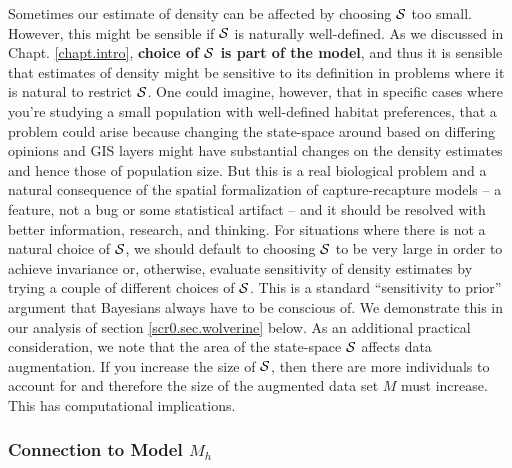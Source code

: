 Sometimes our estimate of density can be affected by choosing ${\cal
  S}$ too small. However, this might be sensible if ${\cal S}$ is
naturally well-defined. As we discussed in Chapt. \ref{chapt.intro},
{\bf choice of ${\cal S}$ is part of the model}, and thus it is
sensible that estimates of density might be sensitive to its
definition in problems where it is natural to restrict ${\cal S}$.
One could imagine, however, that in specific cases where you're
studying a small population with well-defined habitat preferences,
that a problem could arise because changing the state-space around
based on differing opinions and GIS layers might have substantial
changes on the density estimates and hence those of population
size. But this is a real biological problem and a natural consequence
of the spatial formalization of capture-recapture models -- a feature,
not a bug or some statistical artifact -- and it should be resolved
with better information, research, and thinking.  For situations where
there is not a natural choice of ${\cal S}$, we should default to
choosing ${\cal S}$ to be very large in order to achieve invariance
or, otherwise, evaluate sensitivity of density estimates by trying a
couple of different choices of ${\cal S}$. This is a standard
``sensitivity to prior'' argument that Bayesians always have to be
conscious of.  We demonstrate this in our analysis of section
\ref{scr0.sec.wolverine} below. As an additional practical
consideration, we note that the area of the state-space ${\cal S}$
affects data
augmentation. If you increase the size of ${\cal S}$, then there are more
individuals to account for and therefore the size of the augmented
data set $M$ must increase. This has computational implications.



\subsubsection{Connection to Model  $M_h$}  \label{scr0.sec.scrmh}

